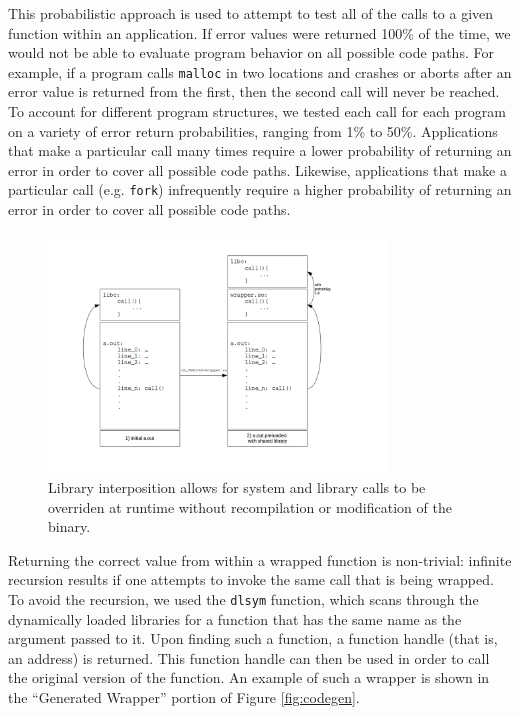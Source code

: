 This probabilistic approach is used to attempt to test all of the calls to a given function within an application. If error values were returned 100\% of the time, we would not be able to evaluate program behavior on all possible code paths. For example, if a program calls \texttt{malloc} in two locations and crashes or aborts after an error value is returned from the first, then the second call will never be reached. To account for different program structures, we tested each call for each program on a variety of error return probabilities, ranging from 1\% to 50\%. Applications that make a particular call many times require a lower probability of returning an error in order to cover all possible code paths. Likewise, applications that make a particular call (e.g. \texttt{fork}) infrequently require a higher probability of returning an error in order to cover all possible code paths.
\begin{figure}
  \centering
	\includegraphics[width=0.8\textwidth]{ldpreload_fig}
	\caption{Library interposition allows for system and library calls to be overriden at runtime without recompilation or modification of the binary.}
  \label{fig:ld_preload}
\end{figure}

Returning the correct value from within a wrapped function is non-trivial: infinite recursion results if one attempts to invoke the same call that is being wrapped. To avoid the recursion, we used the \texttt{dlsym} function, which scans through the dynamically loaded libraries for a function that has the same name as the argument passed to it. Upon finding such a function, a function handle (that is, an address) is returned. This function handle can then be used in order to call the original version of the function. An example of such a wrapper is shown in the ``Generated Wrapper'' portion of Figure \ref{fig:codegen}.
